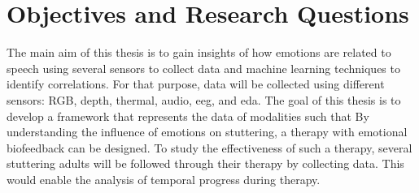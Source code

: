\begin{comment}
The same setting could also be applied to patients with facial paralysis, caused by nerve damage. It usually occurs on only one side of the face and can have different degrees of severity which cause difficulty not only in speaking but also in eating and drinking. Although there are more than twenty grading methods of the severity of facial paralysis, they have defaults in integration, feasibility, accuracy, and reliability \cite{Dong2008}. The development of an accurate method for detection and grading of facial paralysis based on image processing would be beneficial to clinicians and patients.


For both, speech therapy and facial paralysis therapy, treatment takes several months of therapy sessions in which various exercises are performed to improve weakness in oral musculature. The video monitoring during therapy combined with the analysis of face muscle performance could help therapists to follow up the progress of each patient, compare patients with similar problems and even provide therapists with quantitative measurements. The inclusion of affective computing in the face analysis system, would accquire additional information of the patient's degree of engagement during the exercises being an additional factor to a successful therapy. Through the use of different sources of data such as health records, a multimodal time series of observations is used to develop a clinical decision support system that supports therapists in providing personalized therapies.

\end{comment}


\section{Objectives and Research Questions}

The main aim of this thesis is to gain insights of how emotions are related to speech using several sensors to collect data and machine learning techniques to identify correlations. For that purpose, data will be collected using different sensors: RGB, depth, thermal, audio, \gls{eeg}, and \gls{eda}. The goal of this thesis is to develop a framework that represents the data of modalities such that 
By understanding the influence of emotions on stuttering, a therapy with emotional biofeedback can be designed. To study the effectiveness of such a therapy, several stuttering adults will be followed through their therapy by collecting data. This would enable the analysis of temporal progress during therapy.

